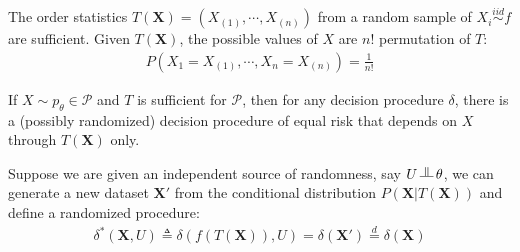 \begin{example}
    The order statistics $T(\boldsymbol{X})=(X_{(1)},\cdots,X_{(n)})$ 
    from a random sample of $X_i\overset{iid}{\sim}f$ are sufficient.
    Given $T(\boldsymbol{X})$, the possible values of $X$ are $n!$ permutation of $T$:
    \begin{gather}
        P(X_1=X_{(1)},\cdots,X_n=X_{(n)})=\frac{1}{n!}
    \end{gather}
\end{example}


\begin{theorem}
    If $X\sim p_\theta\in\mathcal{P}$ and $T$ is sufficient for $\mathcal{P}$,
    then for any decision procedure $\delta$,
    there is a (possibly randomized) decision procedure of equal risk that depends on $X$ through $T(\boldsymbol{X})$ only.
\end{theorem}

\begin{note}
    Suppose we are given an independent source of randomness, 
    say $U\vperp\theta$, we can generate a new dataset $\boldsymbol{X}'$ 
    from the conditional distribution $P(\boldsymbol{X}|T(\boldsymbol{X}))$ and define a randomized procedure:
    \begin{align}
        \delta^*(\boldsymbol{X},U)\triangleq\delta(f(T(\boldsymbol{X})),U)
        =\delta(\boldsymbol{X}')\overset{d}{=}\delta(\boldsymbol{X})
    \end{align}
\end{note}


